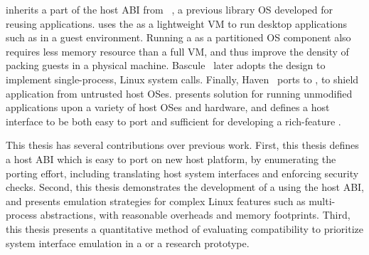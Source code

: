 \graphene{} inherits 
a part of the host ABI from \drawbridge{}~\cite{porter11drawbridge},
a previous library OS developed for reusing 
\win{} applications.
\drawbridge{} uses the \libos{} as a lightweight VM
to run \win{} desktop applications such as in a guest environment.
Running a \libos{} as a partitioned OS component also requires
less memory resource than a full VM,
and thus improve the density of packing guests in a physical machine.
Bascule~\cite{baumann13bascule} later adopts the design
to implement single-process, Linux system calls.
Finally, Haven~\cite{baumann14haven} ports \drawbridge{} to \sgx{}, to shield \win{} application from untrusted host OSes.
\graphene{} %
presents solution for running unmodified applications
upon a variety of host OSes and hardware,
and defines a host interface to be both easy to port and sufficient
for developing a rich-feature \libos{}.



This thesis has several contributions over previous work.
First, this thesis
defines a host ABI which is easy to port
on new host platform,
by enumerating the porting effort, including translating host system interfaces and enforcing security checks.
Second,
this thesis demonstrates the development
of a \libos{}
using the host ABI,
and presents emulation strategies
for complex Linux features such as multi-process abstractions,
with reasonable overheads and memory footprints.
Third,
this thesis presents a quantitative method of evaluating compatibility
to prioritize system interface emulation
in a \libos{} or a research prototype.
 



